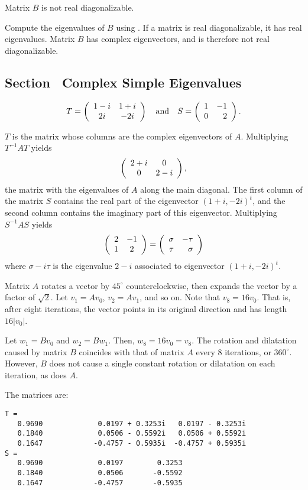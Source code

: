 \ans Matrix $B$ is not real diagonalizable.

\soln Compute the eigenvalues of $B$ using \Matlabp.  If a matrix is
real diagonalizable, it has real eigenvalues.  Matrix $B$ has complex
eigenvectors, and is therefore not real diagonalizable.



\subsection*{Section~\protect{\ref{S:CSE}} Complex Simple Eigenvalues}

\ans
\[
T = \left(\begin{array}{cc} 1 - i & 1 + i\\ 2i &-2i\end{array}\right)
\quad\mbox{and}\quad S = \left(\begin{array}{rr} 1 & -1\\ 0 &2\end{array}\right).
\]

\soln $T$ is the matrix whose columns are the complex eigenvectors
of $A$.  Multiplying $T^{-1}AT$ yields
\[
\left(\begin{array}{cc} 2 + i & 0\\ 0 &2 - i\end{array}\right),
\]
the matrix with the eigenvalues of $A$ along the main diagonal.  The
first column of the matrix $S$ contains the real part of the eigenvector
$(1 + i, -2i)^t$, and the second column contains the imaginary part of
this eigenvector. Multiplying $S^{-1}AS$ yields
\[
\left(\begin{array}{cc} 2 & -1\\ 1 &2\end{array}\right) = \left(\begin{array}{rr} \sigma & -\tau\\ \tau &\sigma\end{array}\right)
\]
where $\sigma - i\tau$ is the eigenvalue $2 - i$ associated to
eigenvector $(1 + i, -2i)^t$.

Matrix $A$ rotates a vector by $45^{\circ}$ counterclockwise, then expands
the vector by a factor of $\sqrt{2}$.  Let $v_1 = Av_0$, $v_2 =
Av_1$, and so on.  Note that $v_8 = 16v_0$.  That is, after eight
iterations, the vector points in its original direction and has length
$16|v_0|$.

\para Let $w_1 = Bv_0$ and $w_2 = Bw_1$.  Then, $w_8 = 16v_0
= v_8$.  The rotation and dilatation caused by matrix $B$ coincides
with that of matrix $A$ every 8 iterations, or $360^\circ$.  However,
$B$ does not cause a single constant rotation or dilatation on each
iteration, as does $A$.

\ans The matrices are:
\begin{verbatim}
T =
   0.9690             0.0197 + 0.3253i   0.0197 - 0.3253i
   0.1840             0.0506 - 0.5592i   0.0506 + 0.5592i
   0.1647            -0.4757 - 0.5935i  -0.4757 + 0.5935i
S =
   0.9690             0.0197        0.3253   
   0.1840             0.0506       -0.5592 
   0.1647            -0.4757       -0.5935 
\end{verbatim}

